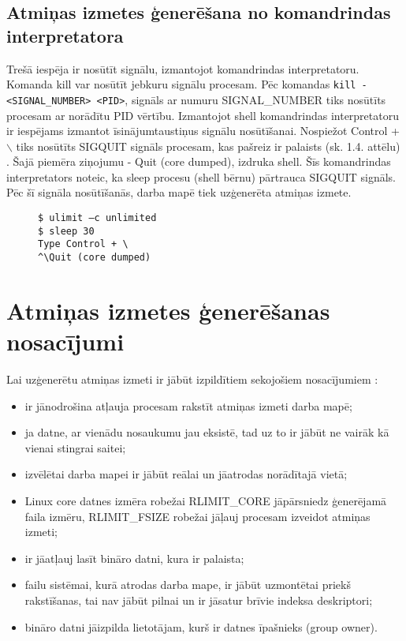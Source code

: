 \subsection{Atmiņas izmetes ģenerēšana no komandrindas interpretatora}
Trešā iespēja ir nosūtīt signālu, izmantojot komandrindas interpretatoru. 
Komanda kill var nosūtīt jebkuru signālu procesam.
Pēc komandas  \texttt{kill -<SIGNAL\_NUMBER> <PID>}, signāls ar numuru  SIGNAL\_NUMBER tiks nosūtīts procesam ar norādītu PID vērtību.
Izmantojot shell komandrindas interpretatoru ir  iespējams izmantot īsinājumtaustiņus signālu nosūtīšanai. 
Nospiežot Control + $\backslash$ tiks nosūtīts SIGQUIT signāls procesam, kas pašreiz ir palaists (sk. 1.4. attēlu) \cite {nosacijumi}. 
Šajā piemēra ziņojumu - Quit (core dumped), izdruka shell. 
Šīs komandrindas interpretators noteic, ka  sleep procesu (shell bērnu) pārtrauca SIGQUIT signāls. 
Pēc šī signāla nosūtīšanās, darba mapē tiek uzģenerēta atmiņas izmete. 

\begin{figure}[h]
\begin{lstlisting}[style=customgdb]
$ ulimit –c unlimited
$ sleep 30
Type Control + \
^\Quit (core dumped)
\end{lstlisting}
\caption{\textbf{\fontsize{11}{12}\selectfont {Atmiņas izmetes ģenerēšana, izmantojot īsinājumtaustiņus}}}
\end{figure}
  
\section{Atmiņas izmetes ģenerēšanas nosacījumi}
Lai  uzģenerētu atmiņas izmeti ir jābūt izpildītiem sekojošiem nosacījumiem \cite {nosacijumi}:
\begin{itemize}
	\item   ir jānodrošina atļauja procesam rakstīt atmiņas izmeti darba mapē;
	\item 	ja datne, ar vienādu nosaukumu jau eksistē, tad uz to ir jābūt ne vairāk kā vienai stingrai saitei;
	\item 	izvēlētai darba mapei ir jābūt reālai un jāatrodas norādītajā vietā;
	\item 	Linux core datnes izmēra robežai {RLIMIT\_CORE} jāpārsniedz ģenerējamā faila izmēru, { RLIMIT\_FSIZE} robežai jāļauj procesam izveidot atmiņas izmeti;
	\item 	ir  jāatļauj lasīt bināro datni, kura ir palaista;
	\item 	failu sistēmai, kurā atrodas darba mape, ir jābūt uzmontētai priekš rakstīšanas, tai nav jābūt pilnai un ir jāsatur brīvie indeksa deskriptori;
	\item 	bināro datni jāizpilda lietotājam, kurš ir datnes īpašnieks (group owner).
\end{itemize} 
 
